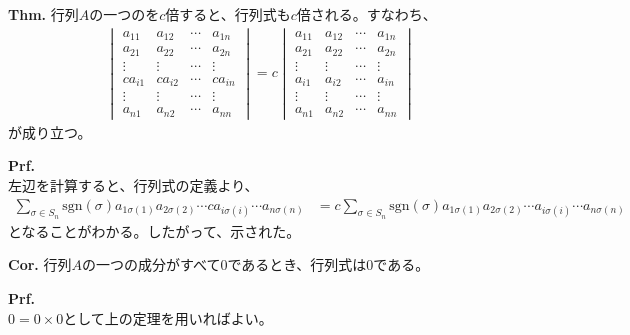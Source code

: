 \documentclass[a4paper,11pt]{jsarticle}
\numberwithin{equation}{section}
\begin{document}
\begin{itembox}[l]{\textbf{Thm.}}
  行列$A$の一つのを$c$倍すると、行列式も$c$倍される。すなわち、
  \begin{align}
      \begin{vmatrix}
        a_{11} & a_{12} & \cdots & a_{1n}\\
        a_{21} & a_{22} & \cdots & a_{2n}\\
        \vdots & \vdots & \cdots & \vdots\\
        ca_{i1} & ca_{i2} & \cdots & ca_{in}\\
        \vdots & \vdots & \cdots & \vdots\\
        a_{n1} & a_{n2} & \cdots & a_{nn}
      \end{vmatrix}
      =c
      \begin{vmatrix}
        a_{11} & a_{12} & \cdots & a_{1n}\\
        a_{21} & a_{22} & \cdots & a_{2n}\\
        \vdots & \vdots & \cdots & \vdots\\
        a_{i1} & a_{i2} & \cdots & a_{in}\\
        \vdots & \vdots & \cdots & \vdots\\
        a_{n1} & a_{n2} & \cdots & a_{nn}
      \end{vmatrix}
    \end{align}
    が成り立つ。
\end{itembox}
\textbf{Prf.}\\
左辺を計算すると、行列式の定義より、
\begin{align}
  \sum_{\sigma \in S_n} \text{sgn}(\sigma) a_{1\sigma(1)}a_{2\sigma(2)}\cdots ca_{i\sigma(i)}\cdots a_{n\sigma(n)} 
  &= c \sum_{\sigma \in S_n} \text{sgn}(\sigma) a_{1\sigma(1)}a_{2\sigma(2)}\cdots a_{i\sigma(i)}\cdots a_{n\sigma(n)}
\end{align}
となることがわかる。したがって、示された。\hfill\qedsymbol\\

\begin{itembox}[l]{\textbf{Cor.}}
  行列$A$の一つの成分がすべて$0$であるとき、行列式は$0$である。
\end{itembox}
\textbf{Prf.}\\
$0 = 0 \times 0$として上の定理を用いればよい。\hfill\qedsymbol\\
\end{document}
